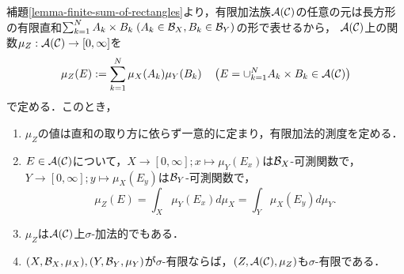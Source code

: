 \documentclass[uplatex, dvipdfmx]{jsreport}
\begin{document}
\begin{lemma}[直積測度の積分表示]\label{lemma-integral-expression-of-product-measure}
    補題\ref{lemma-finite-sum-of-rectangles}より，有限加法族$\mathcal{A}(\mathcal{C})$の任意の元は長方形の有限直和$\sum_{k=1}^NA_k\times B_k\;(A_k\in\mathcal{B}_X,B_k\in\mathcal{B}_Y)$の形で表せるから，
    $\mathcal{A}(\mathcal{C})$上の関数$\mu_Z:\mathcal{A}(\mathcal{C})\to[0,\infty]$を\[\mu_Z(E):=\sum_{k=1}^N\mu_X(A_k)\mu_Y(B_k)\quad\left(E=\cup_{k=1}^NA_k\times B_k\in\mathcal{A}(\mathcal{C})\right)\]
    で定める．このとき，
    \begin{enumerate}
        \item $\mu_Z$の値は直和の取り方に依らず一意的に定まり，有限加法的測度を定める．
        \item $E\in\mathcal{A}(\mathcal{C})$について，$X\to[0,\infty];x\mapsto\mu_Y(E_x)$は$\mathcal{B}_X$-可測関数で，$Y\to[0,\infty];y\mapsto\mu_X(E_y)$は$\mathcal{B}_Y$-可測関数で，
        \[\mu_Z(E)=\int_X\mu_Y(E_x)d\mu_X=\int_Y\mu_X(E_y)d\mu_Y.\]
        \item $\mu_Z$は$\mathcal{A}(\mathcal{C})$上$\sigma$-加法的でもある．
        \item $(X,\mathcal{B}_X,\mu_X),(Y,\mathcal{B}_Y,\mu_Y)$が$\sigma$-有限ならば，$(Z,\mathcal{A}(\mathcal{C}),\mu_Z)$も$\sigma$-有限である．
    \end{enumerate}
\end{lemma}
\end{document}
